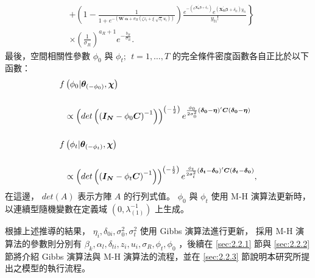\documentclass[12pt,a4paper]{article}
\begin{document}
\begin{CJK}{UTF8}{bkai}
\begin{align*}
 & + \left.\left(1-\frac{1}{1+e^{-(\bm{W^\prime}\bm{\alpha}+\sigma_R(\zeta z_i+\xi \sqrt[]{z_i} u_i))}}\right)\frac{e^{-\left(e^{\bm{X_{ti}^\prime}\bm{\beta}+\delta_{ti}}\right)}e^{\left(\bm{X_{ti}^\prime}\bm{\beta}+\delta_{ti}\right)y_{ti}}}{y_{ti}!} \right\} \\[10mm]
 & \times \left(\frac{1}{\sigma_R}\right)^{a_R+1} e^{-\frac{b_R}{\sigma_R}}.
 \end{align*}
最後，空間相關性參數 $\phi_0$ 與 $\phi_t;\:\:t=1,\ldots,T$ 的完全條件密度函數各自正比於以下函數：
 \begin{align*}
 \setlength\abovedisplayskip{25pt}
 \setlength\belowdisplayskip{25pt}
 f & \left(\phi_0|\bm{\theta}_{(-\phi_0)},\bm{\chi}\right) \\[5mm]
 & \propto \left(det\left(\left(\bm{I_N}-\phi_0\bm{C}\right)^{-1}\right)\right)^{\left(-\frac{1}{2}\right)}e^{\frac{\phi_0}{2\sigma_0^2}\left(\bm{\delta_0}-\bm{\eta}\right)^\prime\bm{C}\left(\bm{\delta_0}-\bm{\eta}\right)} \\[5mm]
 f & \left(\phi_t|\bm{\theta}_{(-\phi_t)},\bm{\chi}\right) \\[5mm]
 & \propto \left(det\left(\left(\bm{I_N}-\phi_t\bm{C}\right)^{-1}\right)\right)^{\left(-\frac{1}{2}\right)}e^{\frac{\phi_t}{2\sigma_t^2}\left(\bm{\delta_t}-\bm{\delta_0}\right)^\prime\bm{C}\left(\bm{\delta_t}-\bm{\delta_0}\right)},
 \end{align*}
\noindent
在這邊， $det(A)$ 表示方陣 $A$ 的行列式值。 $\phi_0$ 與 $\phi_t$ 使用 M-H 演算法更新時，以連續型隨機變數在定義域 $(0,\lambda_{(1)}^{-1})$ 上生成。

根據上述推導的結果， $\eta_i,\delta_{0i},\sigma_0^2,\sigma_t^2$ 使用 Gibbs 演算法進行更新，
採用 M-H 演算法的參數則分別有 $\beta_k,\alpha_l,\delta_{ti},z_i,u_i,\sigma_R,\phi_t,\phi_0$ ，後續在 \ref{sec:2.2.1} 節與 \ref{sec:2.2.2} 節將介紹 Gibbs 演算法與 M-H 演算法的流程，並在 \ref{sec:2.2.3} 節說明本研究所提出之模型的執行流程。




\end{CJK}
\end{document}
